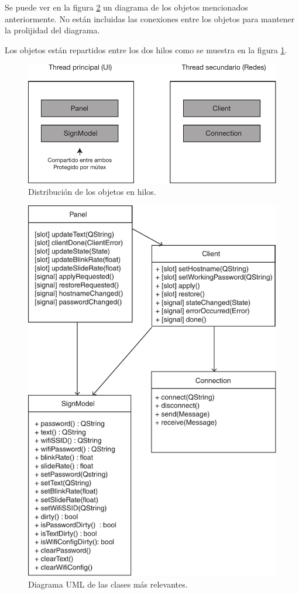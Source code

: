 Se puede ver en la figura \ref{fig:uml-cliente} un diagrama de los objetos mencionados anteriormente. No están incluidas las conexiones entre los objetos para mantener la prolijidad del diagrama.

Los objetos están repartidos entre los dos hilos como se muestra en la figura \ref{fig:qt-threads}.

\begin{figure}[!ht]
	\centering
	\includegraphics[scale=0.8]{imagenes/qt-threads.pdf}
	\caption{Distribución de los objetos en hilos.}
	\label{fig:qt-threads}
\end{figure}

\begin{figure}[!ht]
	\centering
	\includegraphics[scale=0.8]{imagenes/uml-cliente.pdf}
	\caption{Diagrama UML de las clases más relevantes.}
	\label{fig:uml-cliente}
\end{figure}

